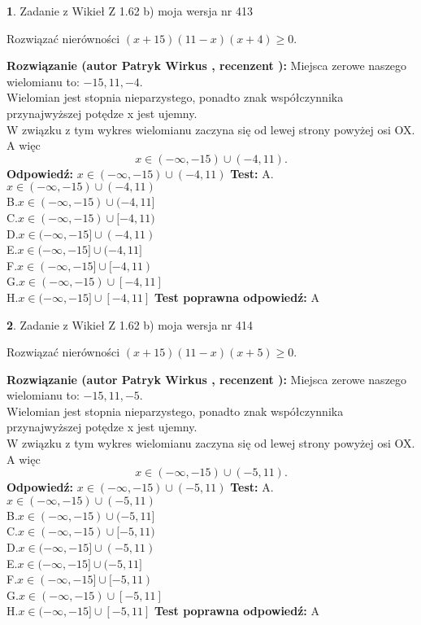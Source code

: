 \documentclass[12pt, a4paper]{article}
\theoremstyle{definition} %
\newtheorem{zad}{}
\newcommand{\zadStart}[1]{\begin{zad}#1\newline}
\newcommand{\zadStop}{\end{zad}}
\newcommand{\rozwStart}[2]{\noindent \textbf{Rozwiązanie (autor #1 , recenzent #2): }\newline}
\newcommand{\rozwStop}{\newline}
\newcommand{\odpStart}{\noindent \textbf{Odpowiedź:}\newline}
\newcommand{\odpStop}{\newline}
\newcommand{\testStart}{\noindent \textbf{Test:}\newline}
\newcommand{\testStop}{\newline}
\newcommand{\kluczStart}{\noindent \textbf{Test poprawna odpowiedź:}\newline}
\newcommand{\kluczStop}{\newline}
\begin{document}
\zadStart{Zadanie z Wikieł Z 1.62 b) moja wersja nr 413}

Rozwiązać nierówności $(x+15)(11-x)(x+4)\ge0$.
\zadStop
\rozwStart{Patryk Wirkus}{}
Miejsca zerowe naszego wielomianu to: $-15, 11, -4$.\\
Wielomian jest stopnia nieparzystego, ponadto znak współczynnika przy\linebreak najwyższej potędze x jest ujemny.\\ W związku z tym wykres wielomianu zaczyna się od lewej strony powyżej osi OX. A więc $$x \in (-\infty,-15) \cup (-4,11).$$
\rozwStop
\odpStart
$x \in (-\infty,-15) \cup (-4,11)$
\odpStop
\testStart
A.$x \in (-\infty,-15) \cup (-4,11)$\\
B.$x \in (-\infty,-15) \cup (-4,11]$\\
C.$x \in (-\infty,-15) \cup [-4,11)$\\
D.$x \in (-\infty,-15] \cup (-4,11)$\\
E.$x \in (-\infty,-15] \cup (-4,11]$\\
F.$x \in (-\infty,-15] \cup [-4,11)$\\
G.$x \in (-\infty,-15) \cup [-4,11]$\\
H.$x \in (-\infty,-15] \cup [-4,11]$
\testStop
\kluczStart
A
\kluczStop



\zadStart{Zadanie z Wikieł Z 1.62 b) moja wersja nr 414}

Rozwiązać nierówności $(x+15)(11-x)(x+5)\ge0$.
\zadStop
\rozwStart{Patryk Wirkus}{}
Miejsca zerowe naszego wielomianu to: $-15, 11, -5$.\\
Wielomian jest stopnia nieparzystego, ponadto znak współczynnika przy\linebreak najwyższej potędze x jest ujemny.\\ W związku z tym wykres wielomianu zaczyna się od lewej strony powyżej osi OX. A więc $$x \in (-\infty,-15) \cup (-5,11).$$
\rozwStop
\odpStart
$x \in (-\infty,-15) \cup (-5,11)$
\odpStop
\testStart
A.$x \in (-\infty,-15) \cup (-5,11)$\\
B.$x \in (-\infty,-15) \cup (-5,11]$\\
C.$x \in (-\infty,-15) \cup [-5,11)$\\
D.$x \in (-\infty,-15] \cup (-5,11)$\\
E.$x \in (-\infty,-15] \cup (-5,11]$\\
F.$x \in (-\infty,-15] \cup [-5,11)$\\
G.$x \in (-\infty,-15) \cup [-5,11]$\\
H.$x \in (-\infty,-15] \cup [-5,11]$
\testStop
\kluczStart
A
\kluczStop
\end{document}
